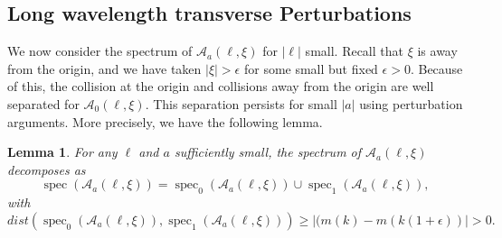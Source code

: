 \documentclass[12pt]{amsart}    %
\renewcommand{\geq}{\geqslant}
\newtheorem{lemma}[theorem]{Lemma}
\numberwithin{equation}{section}
\begin{document}

\subsection{Long wavelength transverse Perturbations}
We now consider the spectrum of $\mathcal A_a(\ell,\xi)$ for $|\ell|$ small. Recall that $\xi$ is away from the origin, and we have taken $|\xi|>\epsilon$ for some small but fixed $\epsilon>0$. Because of this, the collision at the origin and collisions away from the origin are well separated for $\mathcal{A}_0(\ell,\xi)$. This separation persists for small $|a|$ using perturbation arguments. More precisely, we have the following lemma. 
\begin{lemma}\label{l:dec}
For any $\ell$ and $a$ sufficiently small, the spectrum of $\mathcal A_a(\ell,\xi)$ decomposes as 
    \[
    \operatorname{spec}(\mathcal A_a(\ell,\xi)) = \operatorname{spec}_0(\mathcal A_a(\ell,\xi))\cup \operatorname{spec}_1(\mathcal A_a(\ell,\xi)),
    \]
    with 
    \[
dist(\operatorname{spec}_0(\mathcal A_a(\ell,\xi)),\operatorname{spec}_1(\mathcal A_a(\ell,\xi)))\geq|(m(k)-m(k(1+\epsilon))|>0.
\]
\end{lemma}
\end{document}
